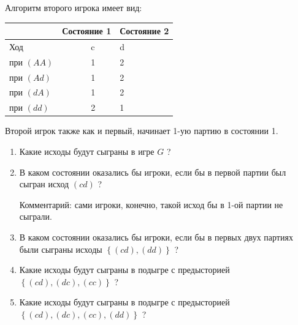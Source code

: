 \begin{problem}
Алгоритм второго игрока имеет вид:


\begin{tabular} {|p{43.12pt}| p{19.60pt}| p{37.52pt}| p{19.60pt}| p{31.92pt}| } \hline
   &  \multicolumn{2}{|l|}{ Состояние 1 } &  \multicolumn{2}{|l|}{ Состояние 2 } \\ \hline
 \multicolumn{2}{|l|}{ Ход } &  \multicolumn{2}{|l|}{ c } &  d  \\ \hline
 \multicolumn{2}{|l|}{ при  $\left(AA\right)$  } &  \multicolumn{2}{|l|}{ 1 } &  2  \\ \hline
 \multicolumn{2}{|l|}{ при  $\left(Ad\right)$  } &  \multicolumn{2}{|l|}{ 1 } &  2  \\ \hline
 \multicolumn{2}{|l|}{ при  $\left(dA\right)$  } &  \multicolumn{2}{|l|}{ 1 } &  2  \\ \hline
 \multicolumn{2}{|l|}{ при  $\left(dd\right)$  } &  \multicolumn{2}{|l|}{ 2 } &  1  \\ \hline
\end{tabular}

Второй игрок также как и первый, начинает 1-ую партию в состоянии 1.
\begin{enumerate}
\item  Какие исходы будут сыграны в игре  $G$ ?\par
\item В каком состоянии оказались бы игроки, если бы в первой партии был сыгран исход  $\left(cd\right)$ ?\par
Комментарий: сами игроки, конечно, такой исход бы в 1-ой партии не сыграли.\par
\item  В каком состоянии оказались бы игроки, если бы в первых двух партиях были сыграны исходы  $\left\{\left(cd\right),\left(dd\right)\right\}$ ?\par
\item Какие исходы будут сыграны в подыгре с предысторией  $\left\{\left(cd\right),\left(dc\right),\left(cc\right)\right\}$ ?
\item Какие исходы будут сыграны в подыгре с предысторией  $\left\{\left(cd\right),\left(dc\right),\left(cc\right),\left(dd\right)\right\}$ ?
\end{enumerate}


\begin{sol}

\end{sol}
\end{problem}



